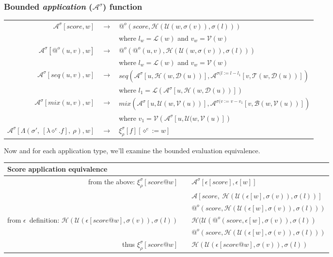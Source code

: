 \documentclass[10pt,a4paper,frenchb]{article}
\makeatletter
\newcommand{\var}[1]	{\ensuremath{\diamond^#1}}
\newcommand{\closure}	{\ensuremath{\Lambda}}
\newcommand{\applyop}	{\ensuremath{@}}
\newcommand{\noredex}	{\ensuremath{\applyop^o}}
\newcommand{\evalsym}			{\ensuremath{\epsilon}}
\newcommand{\boundevalsym}	{\ensuremath{\xi}}
\newcommand{\envsym}			{\ensuremath{\rho}}
\newcommand{\applysym}		{\ensuremath{\mathcal A}}
\newcommand{\boundapplysym}[1]	{\ensuremath{\applysym^{#1}}}
\newcommand{\closenv}[2][f]		{\closure(#2,\ [\lambda \var{e}.#1],\ \envsym)}
\newcommand{\eval}[1]					{\boundevalsym_\envsym^{#1}}
\newcommand{\evalexpr}[2][\bounds]	{\eval{#1}\left[#2\right]}
\newcommand{\evalsimpleshort}[1]		{\evalsym\left[#1\right]}
\newcommand{\apply}[3][\bounds]		{\boundapplysym{#1}\left[#2,#3\right]}
\newcommand{\applysimple}	[2]			{\applysym\left[#1,\ #2\right]}
\newcommand{\result}[2]				{#1}
\newcommand{\equivalence}[1]			{\head( \top (#1, \bounds(v)), \bounds(l))}
\newcommand{\apexpr}[1] 	{#1(u, v)}
\newcommand{\ra}	{\ensuremath{\rightarrow}}
\newcommand{\length}		{\ensuremath{\mathcal L}}
\newcommand{\voices}		{\ensuremath{\mathcal V}}
\newcommand{\dur}			{\ensuremath{\mathcal D}}
\newcommand{\head}			{\ensuremath{\mathcal H}}
\newcommand{\tail}			{\ensuremath{\mathcal T}}
\renewcommand{\top}		{\ensuremath{\mathcal U}}
\newcommand{\bottom}		{\ensuremath{\mathcal B}}
\newcommand{\bounds}		{\ensuremath{\sigma}}
\newcommand{\evaltable}[1][$\rightarrow$]	  {\begin{center} \begin{tabular*}{0.9\linewidth}{rc@{ #1 }l}}
\newcommand{\evaltitle}[1]						{\multicolumn{3}{l}{#1} \\ \hline}
\newcommand{\evaltablend}  		{\end{tabular*}\end{center}}
\newcommand{\evalspace}	  		{\vspace{2mm}\\}
\makeatother
\begin{document}
\subsubsection{Bounded \emph{application} ($\boundapplysym{\bounds} $) function}
\evaltable[]
 $\apply{score}{w}$ 	& \ra & $\result{\noredex(score, \equivalence{w})}{\bounds(l:=l-l_w, v:=v-v_w)}$ \\
				 		& &		\: where $l_w=\length(w)$ and $v_w=\voices(w)$
\evalspace
 $\apply{\noredex (u,v)}{w}$ 	& \ra & $\result{\noredex(\noredex(u,v), \equivalence{w})}{\bounds(l:=l-l_w, v:=v-v_w)}$ \\
				 		& &		\: where $l_w=\length(w)$ and $v_w=\voices(w)$
\evalspace
 $\apply{\apexpr{seq}}{w}$	& \ra & $\result{seq(\apply{u}{\head(w,\dur(u))}, \apply[\bounds(l:=l-l_1]{v}{\tail(w,\dur(u))})}{\bounds(l:=l-l_1-l_2)}$ \\
				 		& &		\: where $l_1=\length(\apply{u}{\head(w,\dur(u))})$ 
\evalspace
 $\apply{\apexpr{mix}}{w}$ 	& \ra & $\result{mix(\apply{u}{\top(w,\voices(u))}, \apply[\bounds(v:=v-v_1]{v}{\bottom(w,\voices(u))})}{\bounds(v:=v-v_1-v_2)}$ \\
				 		& &		\: where $v_1= \voices(\apply{u}{\top(w,\voices(u)})$
\evalspace
 $\apply{\closenv{\bounds'}}{w}$  & \ra & $\evalexpr{f}[\var{e} := w]$ \\

\evaltablend

Now and for each application type, we'll examine the bounded evaluation equivalence. 

\evaltable
\evaltitle {Score application equivalence}
 from the above: \: $\evalexpr{score \applyop w}$ 	& & $\apply{\evalsimpleshort{score}}{\evalsimpleshort{w}}$ \\
									& & $\applysimple{score}{\equivalence{\evalsimpleshort{w}}}$ \\
									& & $\noredex(score, \equivalence{\evalsimpleshort{w}})$
\evalspace
from \evalsym\ definition: \: $\equivalence{\evalsimpleshort{score \applyop w}}$  & & $\equivalence{\noredex(score,\evalsimpleshort{w}}$ \\
									& &  $\noredex(score, \equivalence{\evalsimpleshort{w}})$
\evalspace
thus $\evalexpr{score \applyop w}$ 	& & $\equivalence{\evalsimpleshort{score \applyop w}}$
\evaltablend
\end{document}
